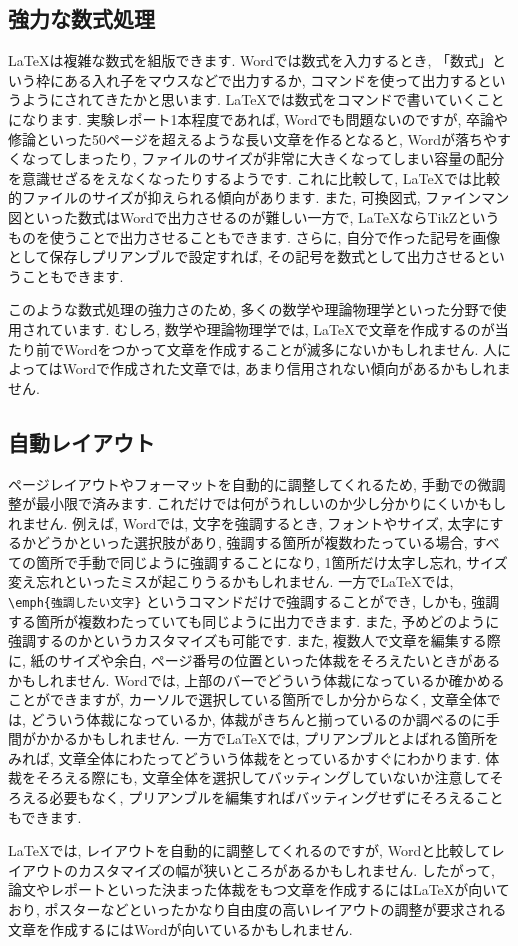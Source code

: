 \documentclass[10pt,a4paper]{jsarticle}
\begin{document}
\subsection{強力な数式処理}
\LaTeX は複雑な数式を組版できます. Wordでは数式を入力するとき, 「数式」という枠にある入れ子をマウスなどで出力するか, コマンドを使って出力するというようにされてきたかと思います. \LaTeX では数式をコマンドで書いていくことになります. 実験レポート1本程度であれば, Wordでも問題ないのですが, 卒論や修論といった50ページを超えるような長い文章を作るとなると, Wordが落ちやすくなってしまったり, ファイルのサイズが非常に大きくなってしまい容量の配分を意識せざるをえなくなったりするようです. これに比較して, \LaTeX では比較的ファイルのサイズが抑えられる傾向があります. また, 可換図式, ファインマン図といった数式はWordで出力させるのが難しい一方で, \LaTeX ならTikZというものを使うことで出力させることもできます. さらに, 自分で作った記号を画像として保存しプリアンブルで設定すれば, その記号を数式として出力させるということもできます. \par
このような数式処理の強力さのため, 多くの数学や理論物理学といった分野で使用されています. むしろ, 数学や理論物理学では, \LaTeX で文章を作成するのが当たり前でWordをつかって文章を作成することが滅多にないかもしれません. 人によってはWordで作成された文章では, あまり信用されない傾向があるかもしれません. 
\subsection{自動レイアウト}
ページレイアウトやフォーマットを自動的に調整してくれるため, 手動での微調整が最小限で済みます. これだけでは何がうれしいのか少し分かりにくいかもしれません. 例えば, Wordでは, 文字を強調するとき, フォントやサイズ, 太字にするかどうかといった選択肢があり, 強調する箇所が複数わたっている場合, すべての箇所で手動で同じように強調することになり, 1箇所だけ太字し忘れ, サイズ変え忘れといったミスが起こりうるかもしれません. 一方で\LaTeX では, \verb|\emph{強調したい文字}| というコマンドだけで強調することができ, しかも, 強調する箇所が複数わたっていても同じように出力できます. また, 予めどのように強調するのかというカスタマイズも可能です. また, 複数人で文章を編集する際に, 紙のサイズや余白, ページ番号の位置といった体裁をそろえたいときがあるかもしれません. Wordでは, 上部のバーでどういう体裁になっているか確かめることができますが, カーソルで選択している箇所でしか分からなく, 文章全体では, どういう体裁になっているか, 体裁がきちんと揃っているのか調べるのに手間がかかるかもしれません. 一方で\LaTeX では, プリアンブルとよばれる箇所をみれば, 文章全体にわたってどういう体裁をとっているかすぐにわかります. 体裁をそろえる際にも, 文章全体を選択してバッティングしていないか注意してそろえる必要もなく, プリアンブルを編集すればバッティングせずにそろえることもできます. \par
\LaTeX では, レイアウトを自動的に調整してくれるのですが, Wordと比較してレイアウトのカスタマイズの幅が狭いところがあるかもしれません. したがって, 論文やレポートといった決まった体裁をもつ文章を作成するには\LaTeX が向いており, ポスターなどといったかなり自由度の高いレイアウトの調整が要求される文章を作成するにはWordが向いているかもしれません. 
\end{document}
